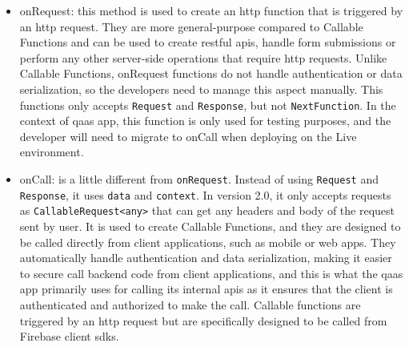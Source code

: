 \begin{itemize}
      \item onRequest: this method is used to create an \acrshort{http} function that is triggered by an \acrshort{http}
            request. They are more general-purpose compared to Callable Functions and can be used to create \acrshort{rest}ful
            \acrshort{api}s, handle form submissions or perform any other server-side operations that require \acrshort{http}
            requests. Unlike Callable Functions, onRequest functions do not handle authentication or data serialization, so
            the developers need to manage this aspect manually. This functions only accepts \texttt{Request} and
            \texttt{Response}, but not \texttt{NextFunction}. In the context of \acrshort{qaas} app, this function is only used
            for testing purposes, and the developer will need to migrate to onCall when deploying on the Live environment.
      \item onCall: is a little different from  \texttt{onRequest}. Instead of using \texttt{Request} and \texttt{Response}, it
            uses \texttt{data} and \texttt{context}. In version 2.0, it only accepts requests as \texttt{CallableRequest<any>} that can get
            any headers and body of the request sent by user. It is used to create Callable Functions, and they are designed to be called
            directly from client applications, such as mobile or web apps. They automatically handle authentication and data serialization,
            making it easier to secure call backend code from client applications, and this is what the \acrshort{qaas} app
            primarily uses for calling its internal \acrshort{api}s as it ensures that the client is authenticated and authorized
            to make the call. Callable functions are triggered by an \acrshort{http} request but are specifically designed to be
            called from Firebase client \acrshort{sdk}s.

\end{itemize}

